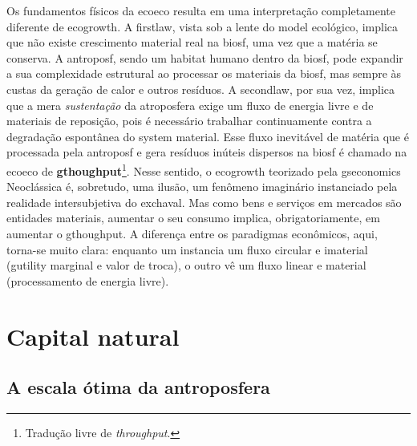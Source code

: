 \documentclass[./main.tex]{subfiles}
\begin{document}
\par Os fundamentos físicos da \gls{ecoeco} resulta em uma interpretação completamente diferente de \gls{ecogrowth}. A \gls{firstlaw}, vista sob a lente do \gls{model} ecológico, implica que não existe crescimento material real na \gls{biosf}, uma vez que a matéria se conserva. A \gls{antroposf}, sendo um habitat humano dentro da \gls{biosf}, pode expandir a sua complexidade estrutural ao processar os materiais da \gls{biosf}, mas sempre às custas da geração de calor e outros resíduos. A \gls{secondlaw}, por sua vez, implica que a mera \textit{sustentação} da atroposfera exige um fluxo de energia livre e de materiais de reposição, pois é necessário trabalhar continuamente contra a degradação espontânea do \gls{system} material. Esse fluxo inevitável de matéria que é processada pela \gls{antroposf} e gera resíduos inúteis dispersos na \gls{biosf} é chamado na \gls{ecoeco} de \textbf{\gls{gthoughput}}\footnote{Tradução livre de \textit{throughput}.}. Nesse sentido, o \gls{ecogrowth} teorizado pela \gls{gseconomics} Neoclássica é, sobretudo, uma ilusão, um fenômeno imaginário instanciado pela realidade intersubjetiva do \gls{exchaval}. Mas como bens e serviços em mercados são entidades materiais, aumentar o seu consumo implica, obrigatoriamente, em aumentar o \gls{gthoughput}. A diferença entre os paradigmas econômicos, aqui, torna-se muito clara: enquanto um instancia um fluxo circular e imaterial (\gls{gutility} marginal e valor de troca), o outro vê um fluxo linear e material (processamento de energia livre).

\section{Capital natural} \label{chap:ecoeco:natcap}

\subsection{A escala ótima da antroposfera} \label{subsec:escaleopt}
\end{document}
